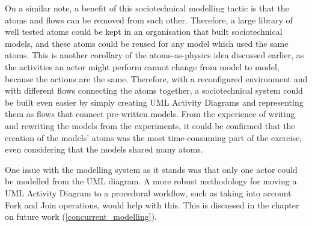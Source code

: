 On a similar note, a benefit of this sociotechnical modelling tactic is that the atoms and flows can be removed from each other. Therefore, a large library of well tested atoms could be kept in an organisation that built sociotechnical models, and these atoms could be reused for any model which used the same atoms. This is another corollary of the atoms-as-physics idea discussed earlier, as the activities an actor might perform cannot change from model to model, because the actions are the same. Therefore, with a reconfigured environment and with different flows connecting the atoms together, a sociotechnical system could be built even easier by simply creating UML Activity Diagrams and representing them as flows that connect pre-written models. From the experience of writing and rewriting the models from the experiments, it could be confirmed that the creation of the models' atoms was the most time-consuming part of the exercise, even considering that the models shared many atoms. \par

One issue with the modelling system as it stands was that only one actor could be modelled from the UML diagram. A more robust methodology for moving a UML Activity Diagram to a procedural workflow, such as taking into account Fork and Join operations, would help with this. This is discussed in the chapter on future work (\cref{concurrent_modelling}). \par